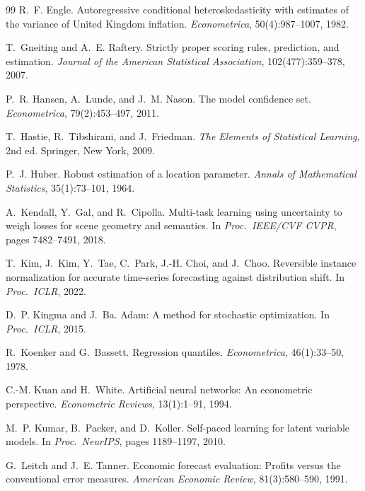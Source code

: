 \documentclass[11pt]{article}
\begin{document}
\begin{thebibliography}{99}
R.~F. Engle.
Autoregressive conditional heteroskedasticity with estimates of the variance
of United Kingdom inflation.
\emph{Econometrica}, 50(4):987--1007, 1982.

T.~Gneiting and A.~E. Raftery.
Strictly proper scoring rules, prediction, and estimation.
\emph{Journal of the American Statistical Association},
102(477):359--378, 2007.

P.~R. Hansen, A.~Lunde, and J.~M. Nason.
The model confidence set.
\emph{Econometrica}, 79(2):453--497, 2011.

T.~Hastie, R.~Tibshirani, and J.~Friedman.
\emph{The Elements of Statistical Learning}, 2nd ed.
Springer, New York, 2009.

P.~J. Huber.
Robust estimation of a location parameter.
\emph{Annals of Mathematical Statistics}, 35(1):73--101, 1964.

A.~Kendall, Y.~Gal, and R.~Cipolla.
Multi-task learning using uncertainty to weigh losses for scene geometry
and semantics.
In \emph{Proc.\ IEEE/CVF CVPR}, pages 7482--7491, 2018.

T.~Kim, J.~Kim, Y.~Tae, C.~Park, J.-H. Choi, and J.~Choo.
Reversible instance normalization for accurate time-series forecasting
against distribution shift.
In \emph{Proc.\ ICLR}, 2022.

D.~P. Kingma and J.~Ba.
Adam: A method for stochastic optimization.
In \emph{Proc.\ ICLR}, 2015.

R.~Koenker and G.~Bassett.
Regression quantiles.
\emph{Econometrica}, 46(1):33--50, 1978.

C.-M. Kuan and H.~White.
Artificial neural networks: An econometric perspective.
\emph{Econometric Reviews}, 13(1):1--91, 1994.

M.~P. Kumar, B.~Packer, and D.~Koller.
Self-paced learning for latent variable models.
In \emph{Proc.\ NeurIPS}, pages 1189--1197, 2010.

G.~Leitch and J.~E. Tanner.
Economic forecast evaluation: Profits versus the conventional error measures.
\emph{American Economic Review}, 81(3):580--590, 1991.


\end{thebibliography}
\end{document}
